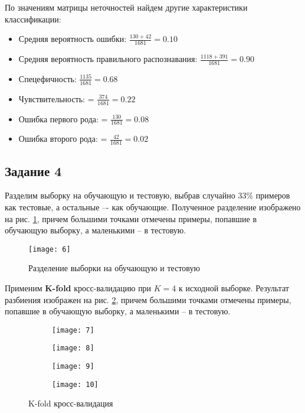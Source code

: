 По значениям матрицы неточностей найдем другие характеристики классификации:
\begin{itemize}
	\setlength\itemsep{0em}
	\item Средняя вероятность ошибки: $\frac{130+42}{1681} = 0.10$
	\item Средняя вероятность правильного распознавания: $\frac{1118+391}{1681} = 0.90$
	\item Спецефичность: $\frac{1135}{1681} = 0.68$
	\item Чувствительность: = $\frac{374}{1681} = 0.22$
	\item Ошибка первого рода: = $\frac{130}{1681} = 0.08$
	\item Ошибка второго рода: = $\frac{42}{1681} = 0.02$
\end{itemize}

\subsection{Задание 4}

Разделим выборку на обучающую и тестовую, выбрав случайно $33\%$ примеров как тестовые, а остальные –- как обучающие. Полученное разделение изображено на рис. \ref{fig:two_classes_train_and_test}, причем большими точками отмечены примеры, попавшие в обучающую выборку, а маленькими -- в тестовую.

\begin{figure}[H]
\begin{center}
	\texttt{[image: 6]}
	\caption{Разделение выборки на обучающую и тестовую}
	\label{fig:two_classes_train_and_test}
\end{center}
\end{figure}

\newpage

Применим \textbf{K-fold} кросс-валидацию при $K=4$ к исходной выборке. Результат разбиения изображен на рис. \ref{fig:two_classes_kfold}, причем большими точками отмечены примеры, попавшие в обучающую выборку, а маленькими -- в тестовую.

\begin{figure}[H]
\begin{center}
	\begin{subfigure}[b]{0.49\textwidth}
		\texttt{[image: 7]}
	\end{subfigure}
	\begin{subfigure}[b]{0.49\textwidth}
		\texttt{[image: 8]}
	\end{subfigure}
	\begin{subfigure}[b]{0.49\textwidth}
		\texttt{[image: 9]}
	\end{subfigure}
	\begin{subfigure}[b]{0.49\textwidth}
		\texttt{[image: 10]}
	\end{subfigure}
	\caption{K-fold кросс-валидация}
	\label{fig:two_classes_kfold}
\end{center}
\end{figure}

